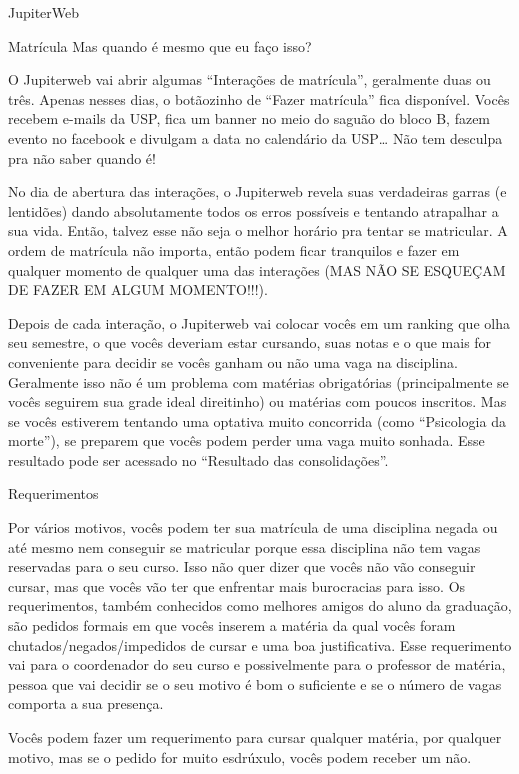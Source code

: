 \begin{secao}{JupiterWeb}
\begin{subsecao}{Matrícula}
Mas quando é mesmo que eu faço isso?

O Jupiterweb vai abrir algumas “Interações de matrícula”, geralmente duas ou três.
Apenas nesses dias, o botãozinho de “Fazer matrícula” fica disponível. Vocês
recebem e-mails da USP, fica um banner no meio do saguão do bloco B, fazem
evento no facebook e divulgam a data no calendário da USP… Não tem desculpa pra
não saber quando é!

No dia de abertura das interações, o Jupiterweb revela suas verdadeiras garras
(e lentidões) dando absolutamente todos os erros possíveis e tentando
atrapalhar a sua vida. Então, talvez esse não seja o melhor horário pra tentar
se matricular. A ordem de matrícula não importa, então podem ficar tranquilos e
fazer em qualquer momento de qualquer uma das interações (MAS NÃO SE ESQUEÇAM DE
FAZER EM ALGUM MOMENTO!!!).

Depois de cada interação, o Jupiterweb vai colocar vocês em um ranking que olha seu
semestre, o que vocês deveriam estar cursando, suas notas e o que mais for
conveniente para decidir se vocês ganham ou não uma vaga na disciplina.
Geralmente isso não é um problema com matérias obrigatórias (principalmente se
vocês seguirem sua grade ideal direitinho) ou matérias com poucos inscritos. Mas
se vocês estiverem tentando uma optativa muito concorrida (como ``Psicologia da
morte''), se preparem que vocês podem perder uma vaga muito sonhada.
Esse resultado pode ser acessado no ``Resultado das consolidações''.

\end{subsecao}

\begin{subsecao}{Requerimentos}

Por vários motivos, vocês podem ter sua matrícula de uma disciplina negada ou
até mesmo nem conseguir se matricular porque essa disciplina não tem vagas
reservadas para o seu curso. Isso não quer dizer que vocês não vão conseguir
cursar, mas que vocês vão ter que enfrentar mais burocracias para isso. Os
requerimentos, também conhecidos como melhores amigos do aluno da graduação,
são pedidos formais em que vocês inserem a matéria da qual vocês foram
chutados/negados/impedidos de cursar e uma boa justificativa. Esse requerimento
vai para o coordenador do seu curso e possivelmente para o professor de
matéria, pessoa que vai decidir se o seu motivo é bom o suficiente e se o
número de vagas comporta a sua presença.

Vocês podem fazer um requerimento para cursar qualquer matéria, por qualquer
motivo, mas se o pedido for muito esdrúxulo, vocês podem receber um não.


\end{subsecao}
\end{secao}
